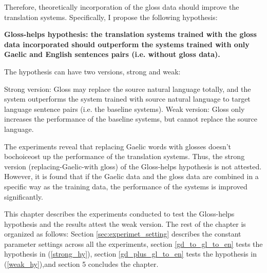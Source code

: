 Therefore, theoretically incorporation of the gloss data should improve the translation systems. Specifically, I propose the following hypothesis:
\begin{exe} 
\ex \textbf{Gloss-helps hypothesis: the translation systems trained with the gloss data incorporated should outperform the systems trained with only Gaelic and English sentences pairs (i.e. without gloss data).}

The hypothesis can have two versions, strong and weak:
	\begin{xlist}
	\ex \label{strong_hy} Strong version: Gloss may replace the source natural language totally, and the system outperforms the system trained with source natural language to target language sentence pairs (i.e. the baseline systems).  
	\ex \label{weak_hy} Weak version: Gloss only increases the performance of the baseline systems, but cannot replace the source language.
	\end{xlist}
\end{exe}

The experiments reveal that replacing Gaelic words with glosses doesn't bochoiceost up the performance of the translation systems. Thus, the strong version (replacing-Gaelic-with gloss) of the Gloss-helps hypothesis is not attested. However, it is found that if the Gaelic data and the gloss data are combined in a specific way as the training data, the performance of the systems is improved significantly. 

This chapter describes the experiments conducted to test the Gloss-helps hypothesis and the results attest the weak version.
The rest of the chapter is organized as follows: Section \ref{sec:experimet_setting} describes the constant parameter settings across all the experiments, section \ref{gd_to_gl_to_en} tests the hypothesis in (\ref{strong_hy}), section \ref{gd_plus_gl_to_en} tests the hypothesis in (\ref{weak_hy}),and section 5 concludes the chapter. 


